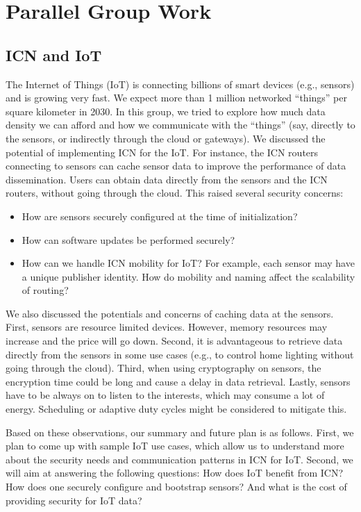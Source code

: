 \section{Parallel Group Work} \label{sec:group-work}
\subsection{ICN and IoT}

The Internet of Things (IoT) is connecting billions of smart devices (e.g., sensors) and is growing very fast. We expect more than 1 million networked ``things'' per square kilometer in 2030. In this group, we tried to explore how much data density we can afford
and how we communicate with the ``things'' (say, directly to the sensors, or indirectly through the cloud or gateways). We discussed the potential of implementing ICN for the IoT. For instance, the ICN routers connecting to sensors can cache sensor data to improve the performance of data dissemination. Users can obtain data directly from the sensors and the ICN routers, without going through the cloud. This raised several security concerns:

\begin{itemize}
\item How are sensors securely configured at the time of initialization?
\item How can software updates be performed securely?
\item How can we handle ICN mobility for IoT? For example, each sensor may have a unique publisher identity. How do mobility and naming affect the scalability of routing?
\end{itemize}

We also discussed the potentials and concerns of caching data at the sensors. First, sensors are resource limited devices. However, memory resources may increase and the price will go down. Second, it is advantageous to retrieve data directly from the sensors in some use cases (e.g., to control home lighting without going through the cloud). Third, when using cryptography on sensors, the encryption time could be long and cause a delay in data retrieval. Lastly, sensors have to be always on to listen to the interests, which may consume a lot of energy. Scheduling or adaptive duty cycles might be considered to mitigate this.

Based on these observations, our summary and future plan is as follows. First, we plan to come up with sample IoT use cases, which allow us to understand more about the security needs and communication patterns in ICN for IoT. Second, we will aim at answering the following questions: How does IoT benefit from ICN? How does one securely configure and bootstrap sensors? And what is the cost of providing security for IoT data?

